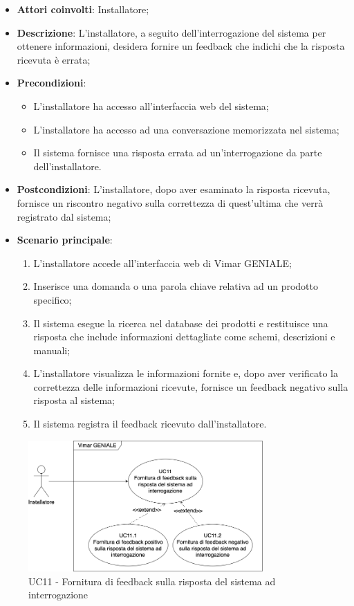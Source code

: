 \begin{itemize}
    \item \textbf{Attori coinvolti}: Installatore;
    \item \textbf{Descrizione}: L’installatore, a seguito dell’interrogazione del sistema per ottenere informazioni, desidera fornire un feedback che indichi che la risposta ricevuta è errata;
    \item \textbf{Precondizioni}: 
        \begin{itemize}
            \item L’installatore ha accesso all’interfaccia web del sistema;
            \item L’installatore ha accesso ad una conversazione memorizzata nel sistema;
            \item Il sistema fornisce una risposta errata ad un’interrogazione da parte dell’installatore.
        \end{itemize}
    \item \textbf{Postcondizioni}: L’installatore, dopo aver esaminato la risposta ricevuta, fornisce un riscontro negativo sulla correttezza di quest’ultima che verrà registrato dal sistema;
    \item \textbf{Scenario principale}:
    \begin{enumerate}
    \item L’installatore accede all’interfaccia web di Vimar GENIALE;
    \item Inserisce una domanda o una parola chiave relativa ad un prodotto specifico;
    \item Il sistema esegue la ricerca nel database dei prodotti e restituisce una risposta che include informazioni dettagliate come schemi, descrizioni e manuali;
    \item L’installatore visualizza le informazioni fornite e, dopo aver verificato la correttezza delle informazioni ricevute, fornisce un feedback negativo sulla risposta al sistema;
    \item Il sistema registra il feedback ricevuto dall’installatore.
    \end{enumerate}
\end{itemize}
\begin{figure}[H]
\centering
\includegraphics[width=0.8\textwidth]{contents/casi_duso/png/UC11.png}
\caption{UC11 - Fornitura di feedback sulla risposta del sistema ad interrogazione}
\end{figure}


